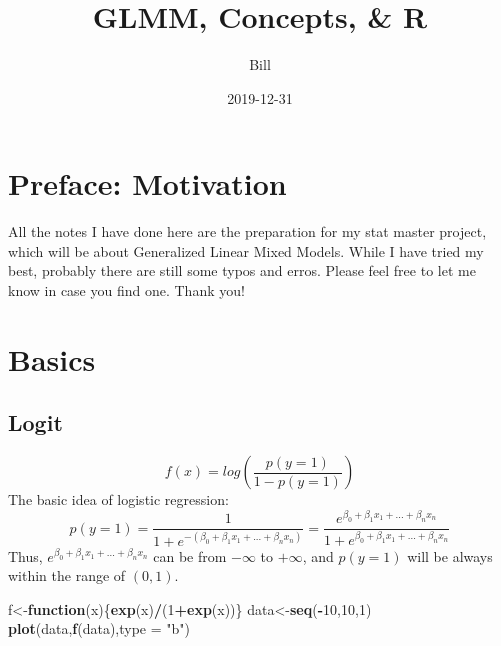 \documentclass[]{book}
\title{GLMM, Concepts, \& R}
\author{Bill}
\date{2019-12-31}
\newenvironment{Shaded}{\begin{snugshade}}{\end{snugshade}}
\newcommand{\KeywordTok}[1]{\textcolor[rgb]{0.13,0.29,0.53}{\textbf{#1}}}
\newcommand{\DataTypeTok}[1]{\textcolor[rgb]{0.13,0.29,0.53}{#1}}
\newcommand{\DecValTok}[1]{\textcolor[rgb]{0.00,0.00,0.81}{#1}}
\newcommand{\StringTok}[1]{\textcolor[rgb]{0.31,0.60,0.02}{#1}}
\newcommand{\ControlFlowTok}[1]{\textcolor[rgb]{0.13,0.29,0.53}{\textbf{#1}}}
\newcommand{\OperatorTok}[1]{\textcolor[rgb]{0.81,0.36,0.00}{\textbf{#1}}}
\newcommand{\NormalTok}[1]{#1}
\begin{document}
\maketitle

{
\setcounter{tocdepth}{1}
\tableofcontents
}
\chapter*{Preface: Motivation}\label{my-section}

All the notes I have done here are the preparation for my stat master
project, which will be about Generalized Linear Mixed Models. While I
have tried my best, probably there are still some typos and erros.
Please feel free to let me know in case you find one. Thank you!

\chapter{Basics}\label{basics}

\section{Logit}\label{logit}

\[f(x)=log(\frac{p(y=1)}{1-p(y=1)})\] The basic idea of logistic
regression:
\[p(y=1)=\frac{1}{1+e^{-(\beta_0+\beta_1x_1+...+\beta_nx_n)}}=\frac{e^{\beta_0+\beta_1x_1+...+\beta_nx_n}}{1+e^{\beta_0+\beta_1x_1+...+\beta_nx_n}}\]
Thus, \(e^{\beta_0+\beta_1x_1+...+\beta_nx_n}\) can be from \(-\infty\)
to \(+\infty\), and \(p(y=1)\) will be always within the range of
\((0,1)\).

\begin{Shaded}
\begin{Highlighting}[]
\NormalTok{f<-}\ControlFlowTok{function}\NormalTok{(x)\{}\KeywordTok{exp}\NormalTok{(x)}\OperatorTok{/}\NormalTok{(}\DecValTok{1}\OperatorTok{+}\KeywordTok{exp}\NormalTok{(x))\}}
\NormalTok{data<-}\KeywordTok{seq}\NormalTok{(}\OperatorTok{-}\DecValTok{10}\NormalTok{,}\DecValTok{10}\NormalTok{,}\DecValTok{1}\NormalTok{)}
\KeywordTok{plot}\NormalTok{(data,}\KeywordTok{f}\NormalTok{(data),}\DataTypeTok{type =} \StringTok{"b"}\NormalTok{)}
\end{Highlighting}
\end{Shaded}
\end{document}
